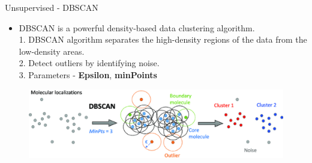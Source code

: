 \documentclass[
 size=14pt,
 paper=smartboard,  %
 mode=present, 		%
 display=slides, 	%
 style=tuliplab,  	%
 pauseslide,
 fleqn,leqno]{powerdot}
\begin{document}
\begin{slide}[toc=,bm=]{Unsupervised - DBSCAN}
	\begin{itemize}
	\item
	DBSCAN is a powerful density-based data clustering algorithm.\\
	1. DBSCAN algorithm separates the high-density regions of the data from the low-density areas.\\
	2. Detect outliers by identifying noise. \\
	3. Parameters - \textbf{Epsilon}, \textbf{minPoints}
\end{itemize}

\begin{figure}
	\centering
	\includegraphics[scale=0.6]{dbscan.eps}
\end{figure}
\end{slide}
\end{document}
